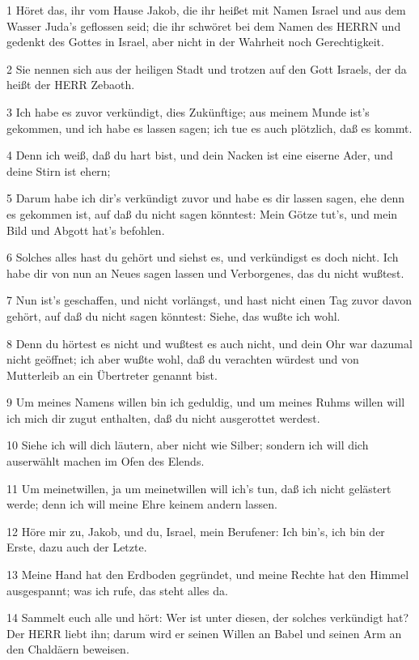 \par 1 Höret das, ihr vom Hause Jakob, die ihr heißet mit Namen Israel und aus dem Wasser Juda's geflossen seid; die ihr schwöret bei dem Namen des HERRN und gedenkt des Gottes in Israel, aber nicht in der Wahrheit noch Gerechtigkeit.
\par 2 Sie nennen sich aus der heiligen Stadt und trotzen auf den Gott Israels, der da heißt der HERR Zebaoth.
\par 3 Ich habe es zuvor verkündigt, dies Zukünftige; aus meinem Munde ist's gekommen, und ich habe es lassen sagen; ich tue es auch plötzlich, daß es kommt.
\par 4 Denn ich weiß, daß du hart bist, und dein Nacken ist eine eiserne Ader, und deine Stirn ist ehern;
\par 5 Darum habe ich dir's verkündigt zuvor und habe es dir lassen sagen, ehe denn es gekommen ist, auf daß du nicht sagen könntest: Mein Götze tut's, und mein Bild und Abgott hat's befohlen.
\par 6 Solches alles hast du gehört und siehst es, und verkündigst es doch nicht. Ich habe dir von nun an Neues sagen lassen und Verborgenes, das du nicht wußtest.
\par 7 Nun ist's geschaffen, und nicht vorlängst, und hast nicht einen Tag zuvor davon gehört, auf daß du nicht sagen könntest: Siehe, das wußte ich wohl.
\par 8 Denn du hörtest es nicht und wußtest es auch nicht, und dein Ohr war dazumal nicht geöffnet; ich aber wußte wohl, daß du verachten würdest und von Mutterleib an ein Übertreter genannt bist.
\par 9 Um meines Namens willen bin ich geduldig, und um meines Ruhms willen will ich mich dir zugut enthalten, daß du nicht ausgerottet werdest.
\par 10 Siehe ich will dich läutern, aber nicht wie Silber; sondern ich will dich auserwählt machen im Ofen des Elends.
\par 11 Um meinetwillen, ja um meinetwillen will ich's tun, daß ich nicht gelästert werde; denn ich will meine Ehre keinem andern lassen.
\par 12 Höre mir zu, Jakob, und du, Israel, mein Berufener: Ich bin's, ich bin der Erste, dazu auch der Letzte.
\par 13 Meine Hand hat den Erdboden gegründet, und meine Rechte hat den Himmel ausgespannt; was ich rufe, das steht alles da.
\par 14 Sammelt euch alle und hört: Wer ist unter diesen, der solches verkündigt hat? Der HERR liebt ihn; darum wird er seinen Willen an Babel und seinen Arm an den Chaldäern beweisen.
